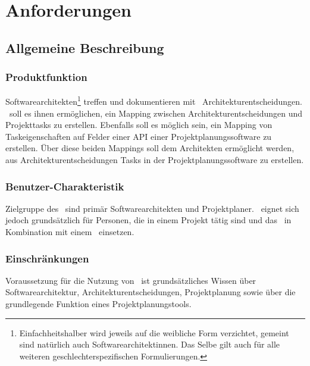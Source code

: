 \chapter{Anforderungen}
\section{Allgemeine Beschreibung}

\subsection{Produktfunktion}
Softwarearchitekten\footnote{Einfachheitshalber wird jeweils auf die weibliche Form verzichtet, gemeint sind natürlich auch Softwarearchitektinnen. Das Selbe gilt auch für alle weiteren geschlechterspezifischen Formulierungen.} treffen und dokumentieren mit \cdar\ Architekturentscheidungen.
\eeppi\ soll es ihnen ermöglichen, ein Mapping zwischen Architekturentscheidungen und Projekttasks zu erstellen.
Ebenfalls soll es möglich sein, ein Mapping von Taskeigenschaften auf Felder einer API einer Projektplanungssoftware zu erstellen.
Über diese beiden Mappings soll dem Architekten ermöglicht werden, aus Architekturentscheidungen Tasks in der Projektplanungssoftware zu erstellen.

\subsection{Benutzer-Charakteristik}
Zielgruppe des \eeppi\ sind primär Softwarearchitekten und Projektplaner. \eeppi\ eignet sich jedoch grundsätzlich für Personen, die in einem Projekt tätig sind und das \cdar\ in Kombination mit einem \ppt\ einsetzen.

\subsection{Einschränkungen}
Voraussetzung für die Nutzung von \eeppi\ ist grundsätzliches Wissen über Softwarearchitektur, Architekturentscheidungen, Projektplanung sowie über die grundlegende Funktion eines Projektplanungstools.

